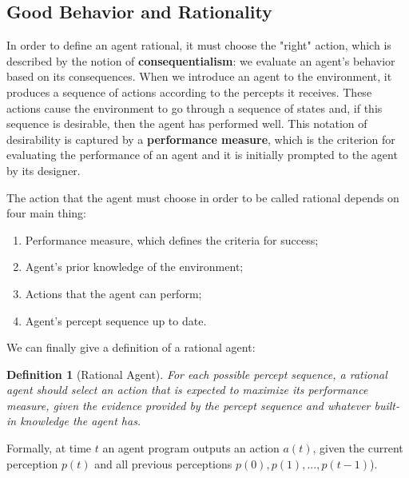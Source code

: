 \documentclass{article}
\newtheorem{definition}{Definition}
\begin{document}
\subsection{Good Behavior and Rationality}
In order to define an agent rational, it must choose the "right" action, which is described by the notion of \textbf{consequentialism}: we evaluate an agent's behavior based on its consequences. When we introduce an agent to the environment, it produces a sequence of actions according to the percepts it receives. These actions cause the environment to go through a sequence of states and, if this sequence is desirable, then the agent has performed well. This notation of desirability is captured by a \textbf{performance measure}, which is the criterion for evaluating the performance of an agent and it is initially prompted to the agent by its designer.

The action that the agent must choose in order to be called rational depends on four main thing:
\begin{enumerate}
    \item Performance measure, which defines the criteria for success;
    \item Agent's prior knowledge of the environment;
    \item Actions that the agent can perform;
    \item Agent's percept sequence up to date.
\end{enumerate}

We can finally give a definition of a rational agent:
\begin{definition}[Rational Agent]
For each possible percept sequence, a rational agent should select an action that is expected to maximize its performance measure, given the evidence provided by the percept sequence and whatever built-in knowledge the agent has.
\end{definition}

Formally, at time $t$ an agent program outputs an action $a(t)$, given the current perception $p(t)$ and all previous perceptions $p(0), p(1), ..., p(t-1)$).
\end{document}
